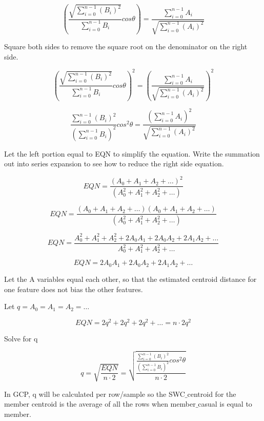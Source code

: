 \documentclass[11pt, onecolumn]{article}
\begin{document}
\begin{equation}
\left(  \frac{ \sqrt{\sum^{n-1}_{i=0} (B_i)^{2}} }{ \sum^{n-1}_{i=0} B_i } cos \theta  \right) = \frac{\sum^{n-1}_{i=0} A_i}{\sqrt{\sum^{n-1}_{i=0} (A_i)^{2}} }
\end{equation}

Square both sides to remove the square root on the denominator on the right side.

\begin{equation}
\left(  \frac{ \sqrt{\sum^{n-1}_{i=0} (B_i)^{2}} }{ \sum^{n-1}_{i=0} B_i } cos \theta  \right)^{2} = \left(  \frac{\sum^{n-1}_{i=0} A_i}{\sqrt{\sum^{n-1}_{i=0} (A_i)^{2}} } \right)^{2}
\end{equation}

\begin{equation}
\frac{ \sum^{n-1}_{i=0} (B_i)^{2}} { (\sum^{n-1}_{i=0} B_i)^{2} } cos^{2} \theta  =   \frac{(\sum^{n-1}_{i=0} A_i)^{2} }{\sqrt{\sum^{n-1}_{i=0} (A_i)^{2}} } 
\end{equation}

Let the left portion equal to EQN to simplify the equation. Write the summation out into series expansion to see how to reduce the right side equation.

\begin{equation}
EQN  =   \frac{(A_0 + A_1 + A_2 + \ldots)^{2} }{(A_{0}^{2} + A_{1}^{2} + A_{2}^{2} + \ldots)} 
\end{equation}

\begin{equation}
EQN  =   \frac{(A_0 + A_1 + A_2 + \ldots)(A_0 + A_1 + A_2 + \ldots) }{(A_{0}^{2} + A_{1}^{2} + A_{2}^{2} + \ldots)} 
\end{equation}

\begin{equation}
EQN  =   \frac{A_{0}^{2} + A_{1}^{2} + A_{2}^{2} + 2A_{0}A_{1} + 2A_{0}A_{2} + 2A_{1}A_{2} + \ldots }{A_{0}^{2} + A_{1}^{2} + A_{2}^{2} + \ldots} 
\end{equation}

\begin{equation}
EQN  =  2A_{0}A_{1} + 2A_{0}A_{2} + 2A_{1}A_{2} + \ldots
\end{equation}

Let the A variables equal each other, so that the estimated centroid distance for one feature does not bias the other features. 

Let $q = A_0 = A_1 = A_2 = \ldots $ 

\begin{equation}
EQN  =  2q^{2} + 2q^{2} + 2q^{2} + \ldots = n \cdot 2q^{2}
\end{equation}

Solve for q

\begin{equation}
q  =  \sqrt{ \frac{ EQN }{ n \cdot 2 }} = \sqrt{ \frac{ \frac{ \sum^{n-1}_{i=0} (B_i)^{2}} { (\sum^{n-1}_{i=0} B_i)^{2} } cos^{2} \theta }{ n \cdot 2 }}
\end{equation}

In GCP, q will be calculated per row/sample so the SWC$\_$centroid for the member centroid is the average of all the rows when member$\_$casual is equal to member.
\end{document}
